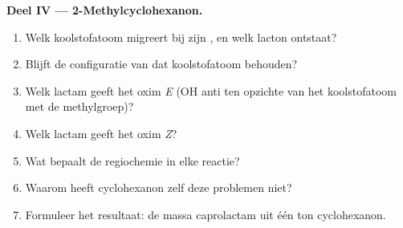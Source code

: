 \begin{problem}
\medskip\noindent\textbf{Deel IV --- 2-Methylcyclohexanon.}
\begin{enumerate}[resume]
  \item Welk koolstofatoom migreert bij zijn , en
        welk lacton ontstaat?
  \item Blijft de configuratie van dat koolstofatoom behouden?
  \item Welk lactam geeft het oxim \textit{E} (OH anti ten opzichte van het koolstofatoom met de methylgroep)?
  \item Welk lactam geeft het oxim \textit{Z}?
  \item Wat bepaalt de regiochemie in elke reactie?
  \item Waarom heeft cyclohexanon zelf deze problemen niet?
  \item Formuleer het resultaat: de massa caprolactam uit één ton
        cyclohexanon.
\end{enumerate}
\end{problem}
